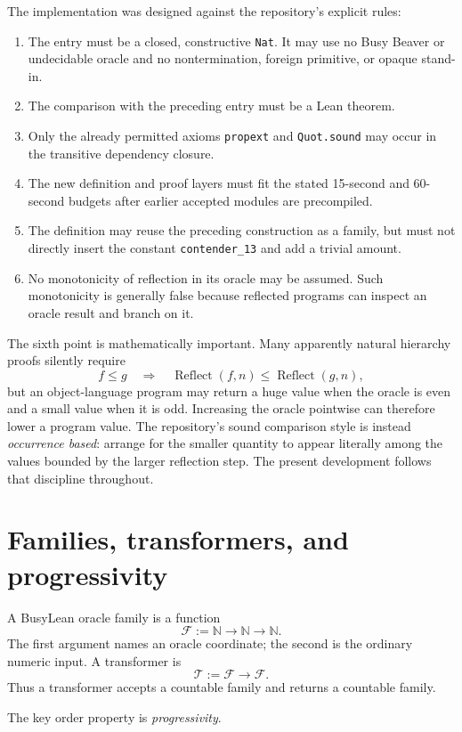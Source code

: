 \documentclass[11pt]{article}
\theoremstyle{definition}
\newcommand{\Nat}{\mathbb{N}}
\newcommand{\Family}{\mathcal{F}}
\newcommand{\Trans}{\mathcal{T}}
\newcommand{\code}[1]{\texttt{#1}}
\begin{document}
The implementation was designed against the repository's explicit rules:
\begin{enumerate}
\item The entry must be a closed, constructive \code{Nat}.  It may use no Busy Beaver or undecidable oracle and no nontermination, foreign primitive, or opaque stand-in.
\item The comparison with the preceding entry must be a Lean theorem.
\item Only the already permitted axioms \code{propext} and \code{Quot.sound} may occur in the transitive dependency closure.
\item The new definition and proof layers must fit the stated 15-second and 60-second budgets after earlier accepted modules are precompiled.
\item The definition may reuse the preceding construction as a family, but must not directly insert the constant \code{contender\_13} and add a trivial amount.
\item No monotonicity of reflection in its oracle may be assumed.  Such monotonicity is generally false because reflected programs can inspect an oracle result and branch on it.
\end{enumerate}

The sixth point is mathematically important.  Many apparently natural hierarchy proofs silently require
\[
  f\le g \quad\Longrightarrow\quad \operatorname{Reflect}(f,n)
  \le \operatorname{Reflect}(g,n),
\]
but an object-language program may return a huge value when the oracle is even and a small value when it is odd.  Increasing the oracle pointwise can therefore lower a program value.  The repository's sound comparison style is instead \emph{occurrence based}: arrange for the smaller quantity to appear literally among the values bounded by the larger reflection step.  The present development follows that discipline throughout.

\section{Families, transformers, and progressivity}

A BusyLean oracle family is a function
\[
  \Family := \Nat\to\Nat\to\Nat.
\]
The first argument names an oracle coordinate; the second is the ordinary numeric input.  A transformer is
\[
  \Trans := \Family\to\Family.
\]
Thus a transformer accepts a countable family and returns a countable family.

The key order property is \emph{progressivity}.
\end{document}
